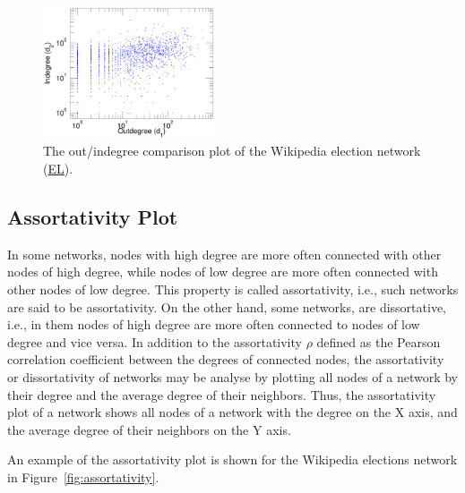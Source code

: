 \documentclass{article}
\newcommand{\wPlot}{0.45\textwidth}
\begin{document}
\begin{figure}
  \centering
  \includegraphics[width=\wPlot]{plot/outin.b.elec}
  \caption{
    \label{fig:outin}
    The out/indegree comparison plot of the Wikipedia election network 
    (\href{http://konect.uni-koblenz.de/networks/elec}{\textsf{EL}}).
  }
\end{figure}

\subsection{Assortativity Plot}
In some networks, nodes with high degree are more often connected with
other nodes of high degree, while nodes of low degree are more often
connected with other nodes of low degree.  This property is called
assortativity, i.e., such networks are said to be assortativity.  On the
other hand, some networks, are dissortative, i.e., in them nodes of high
degree are more often connected to nodes of low degree and vice versa.
In addition to the assortativity $\rho$ defined as the Pearson
correlation coefficient between the degrees of connected nodes, the
assortativity or dissortativity of networks may be analyse by plotting
all nodes of a network by their degree and the average degree of their
neighbors.  Thus, the assortativity plot of a network shows all nodes of
a network with the degree on the X axis, and the average degree of their
neighbors on the Y axis. 

An example of the assortativity plot is shown for the Wikipedia
elections network in Figure~\ref{fig:assortativity}. 
\end{document}
